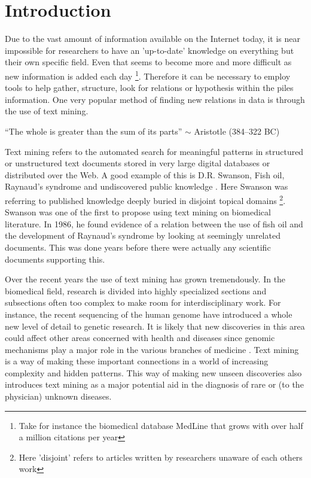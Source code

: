 \chapter{Introduction\label{Introduction}}

Due to the vast amount of information available on the Internet today,
it is near impossible for researchers to have an 'up-to-date'
knowledge on everything but their own specific field. Even that seems
to become more and more difficult as new information is added each
day \cite{CitAddMedLine} \footnote{Take for instance the biomedical database MedLine that
grows with over half a million citations per year}. Therefore
it can be necessary to employ tools to help gather, structure, look
for relations or hypothesis within the piles information. One very
popular method of finding new relations in data is through the use of
text mining.

``The whole is greater than the sum of its parts'' $\sim$ Aristotle
(384--322 BC)

Text mining refers to the automated search for meaningful patterns in
structured or unstructured text documents stored in very large digital
databases or distributed over the Web. A good example of this is
D.R. Swanson, Fish oil, Raynaud's syndrome and undiscovered public
knowledge . Here
Swanson was referring to published knowledge deeply buried in disjoint
topical domains \footnote{Here 'disjoint' refers to articles written
  by researchers unaware of each others work}. Swanson was one of the
first to propose using text mining on biomedical literature. In 1986,
he found evidence of a relation between the use of fish oil and the
development of Raynaud's syndrome by looking at seemingly unrelated
documents. This was done years before there were actually any
scientific documents supporting this.

Over the recent years the use of text mining has grown
tremendously. In the biomedical field, research is divided into highly
specialized sections and subsections often too complex to make room
for interdisciplinary work. For instance, the recent sequencing of the
human genome have introduced a whole new level of detail to genetic
research. It is likely that new discoveries in this area could affect
other areas concerned with health and diseases since genomic
mechanisms play a major role in the various branches of medicine
\cite{survey.biomed.text.cohen.2005}. Text mining is a way of making
these important connections in a world of increasing complexity and
hidden patterns. This way of making new unseen discoveries also
introduces text mining as a major potential aid in the diagnosis of
rare or (to the physician) unknown diseases.

